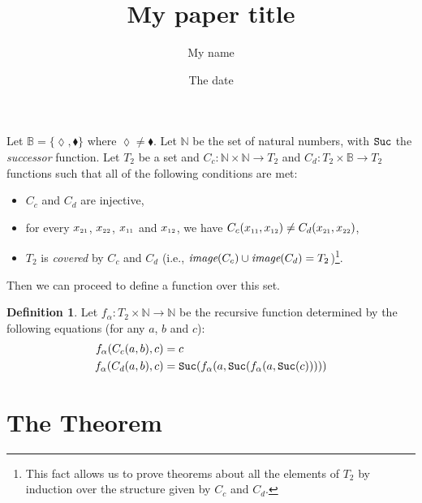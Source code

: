 \documentclass{article}
\title{My paper title}
\author{My name}
\date{The date}
\theoremstyle{definition}
\newtheorem{definition}{Definition}
\begin{document}
\maketitle

Let $\mathbb{B} = \{\lozenge, \blacklozenge \}$ where $\lozenge \neq \blacklozenge$. Let $\mathbb{N}$ be the set of natural numbers, with ${\tt Suc}$ the \textit{successor} function. Let $T_{2}$ be a set and $C_{c} : \mathbb{N} \times 
 \mathbb{N} \to T_{2}$ and $C_{d} : T_{2} \times  \mathbb{B} \to T_{2}$ functions such that all of the following conditions are met: 
\begin{itemize}
\item $C_{c}$ and $C_{d}$ are injective, 
\item for every $x_{\mbox{\tiny 21}}$, $x_{\mbox{\tiny 22}}$, $x_{\mbox{\tiny 11}}$ and $x_{\mbox{\tiny 12}}$, we have $C_{c}(x_{\mbox{\tiny 11}}, x_{\mbox{\tiny 12}}) \neq C_{d}(x_{\mbox{\tiny 21}}, x_{\mbox{\tiny 22}})$,
\item $T_{2}$  is \textit{covered} by $C_{c}$ and $C_{d}$ (i.e., $\mbox{\it image}(C_{c})\cup\mbox{\it image}(C_{d}) = T_{2}$)\footnote{This fact allows us to prove theorems about all the elements of $T_{2}$ by induction over the structure given by $C_{c}$ and $C_{d}$.}.
\end{itemize}

\noindent Then we can proceed to define a function over this set.

\begin{definition}
Let $f_{\alpha} : T_{2} \times  \mathbb{N} \to \mathbb{N}$ be the recursive function determined by the following equations (for any $a$, $b$ and $c$): 
\begin{align}
f_{\alpha}(C_{c}(a, b), c) &= c \label{f_1.simps_1}\\
f_{\alpha}(C_{d}(a, b), c) &= {\tt{Suc}}(f_{\alpha}(a, {\tt{Suc}}(f_{\alpha}(a, {\tt{Suc}}(c))))) \label{f_1.simps_2}
\end{align}
\end{definition}

\section{The Theorem}
\end{document}
